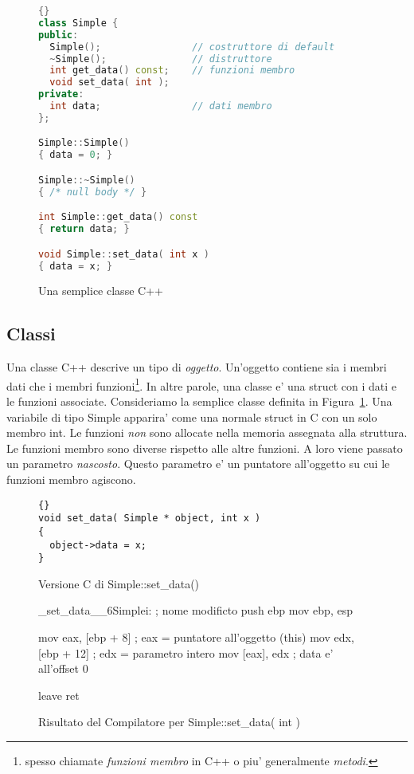 \begin{figure}[t]
\begin{lstlisting}[language=C++,frame=tlrb]{}
class Simple {
public:
  Simple();                // costruttore di default
  ~Simple();               // distruttore
  int get_data() const;    // funzioni membro
  void set_data( int );
private:
  int data;                // dati membro
};

Simple::Simple()
{ data = 0; }

Simple::~Simple()
{ /* null body */ }

int Simple::get_data() const
{ return data; }

void Simple::set_data( int x )
{ data = x; }
\end{lstlisting}
\caption{Una semplice classe C++\label{fig:SimpleClass}}
\end{figure}

\subsection{Classi}

Una classe C++ descrive un tipo di \emph{oggetto}. Un'oggetto contiene
sia i membri dati che i membri funzioni\footnote{spesso chiamate
\emph{funzioni membro} in C++ o piu' generalmente \emph{metodi}.}.
In altre parole, una classe e' una {\code struct} con i dati e le funzioni
associate. Consideriamo la semplice classe definita in Figura~\ref{fig:SimpleClass}.
Una variabile di tipo {\code Simple} apparira' come una normale {\code struct}
in C con un solo membro {\code int}. Le funzioni \emph{non}
sono allocate nella memoria assegnata alla struttura. Le funzioni membro
sono diverse rispetto alle altre funzioni. A loro viene passato un
parametro \emph{nascosto}. Questo parametro e' un puntatore all'oggetto
su cui le funzioni membro agiscono. 

\begin{figure}[t]
\begin{lstlisting}[stepnumber=0]{}
void set_data( Simple * object, int x )
{
  object->data = x;
}
\end{lstlisting}
\caption{Versione C di Simple::set\_data()\label{fig:SimpleCVer}}
\end{figure}


\begin{figure}[t]
\begin{AsmCodeListing}
_set_data__6Simplei:           ; nome modificto
      push   ebp
      mov    ebp, esp

      mov    eax, [ebp + 8]   ; eax = puntatore all'oggetto (this)
      mov    edx, [ebp + 12]  ; edx = parametro intero
      mov    [eax], edx       ; data e' all'offset 0

      leave
      ret
\end{AsmCodeListing}
\caption{Risultato del Compilatore per Simple::set\_data( int ) \label{fig:SimpleAsm}}
\end{figure}


